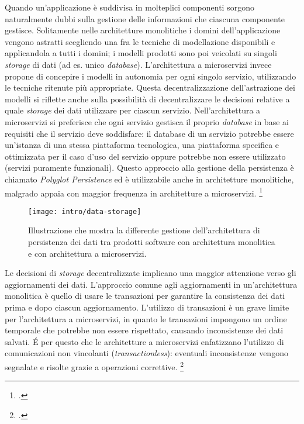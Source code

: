 Quando un'applicazione è suddivisa in molteplici componenti sorgono naturalmente dubbi sulla gestione delle informazioni che ciascuna componente gestisce.
Solitamente nelle architetture monolitiche i domini dell'applicazione vengono astratti scegliendo una fra le tecniche di modellazione disponibili e applicandola a tutti i domini;
i modelli prodotti sono poi veicolati su singoli \emph{storage} di dati (ad es. unico \emph{database}).
L'architettura a microservizi invece propone di concepire i modelli in autonomia per ogni singolo servizio, utilizzando le tecniche ritenute più appropriate.
Questa decentralizzazione dell'astrazione dei modelli si riflette anche sulla possibilità di decentralizzare le decisioni relative a quale \emph{storage} dei dati utilizzare per ciascun servizio.
Nell'architettura a microservizi si preferisce che ogni servizio gestisca il proprio \emph{database} in base ai requisiti che il servizio deve soddisfare: il database di un servizio potrebbe essere un'istanza di una stessa piattaforma tecnologica, una piattaforma specifica e ottimizzata per il caso d'uso del servizio oppure potrebbe non essere utilizzato (servizi puramente funzionali).
Questo approccio alla gestione della persistenza è chiamato \emph{Polyglot Persistence} ed è utilizzabile anche in architetture monolitiche, malgrado appaia con maggior frequenza in architetture a microservizi.
\footcite{site:fowler-microservices}

\begin{figure}[H]
    \centering
    \texttt{[image: intro/data-storage]}
    \caption{Illustrazione che mostra la differente gestione dell'architettura di persistenza dei dati tra prodotti software con architettura monolitica e con architettura a microservizi.\\ \cite{site:fowler-microservices}}
    \label{fig:data-storage}
\end{figure}

Le decisioni di \emph{storage} decentralizzate implicano una maggior attenzione verso gli aggiornamenti dei dati.
L'approccio comune agli aggiornamenti in un'architettura monolitica è quello di usare le transazioni per garantire la consistenza dei dati prima e dopo ciascun aggiornamento.
L'utilizzo di transazioni è un grave limite per l'architettura a microservizi, in quanto le transazioni impongono un ordine temporale che potrebbe non essere rispettato, causando inconsistenze dei dati salvati.
É per questo che le architetture a microservizi enfatizzano l'utilizzo di comunicazioni non vincolanti (\emph{transactionless}): eventuali inconsistenze vengono segnalate e risolte grazie a operazioni correttive.
\footcite{site:fowler-microservices}

